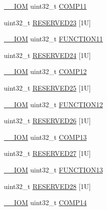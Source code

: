 \begin{DoxyCompactItemize}
\item 
\mbox{\hyperlink{core__cm4_8h_ab6caba5853a60a17e8e04499b52bf691}{\+\_\+\+\_\+\+I\+OM}} uint32\+\_\+t \mbox{\hyperlink{struct_d_w_t___type_ab5e5be1f4cce832413b02bd6eb8175f6}{C\+O\+M\+P11}}
\item 
uint32\+\_\+t \mbox{\hyperlink{struct_d_w_t___type_a214d76797c9fe16de56e22f950f55662}{R\+E\+S\+E\+R\+V\+E\+D23}} \mbox{[}1\+U\mbox{]}
\item 
\mbox{\hyperlink{core__cm4_8h_ab6caba5853a60a17e8e04499b52bf691}{\+\_\+\+\_\+\+I\+OM}} uint32\+\_\+t \mbox{\hyperlink{struct_d_w_t___type_a8e6200039c3ad48f811bd3dac9733523}{F\+U\+N\+C\+T\+I\+O\+N11}}
\item 
uint32\+\_\+t \mbox{\hyperlink{struct_d_w_t___type_a831c72f73ca4a91bc1014ab528a93fc8}{R\+E\+S\+E\+R\+V\+E\+D24}} \mbox{[}1\+U\mbox{]}
\item 
\mbox{\hyperlink{core__cm4_8h_ab6caba5853a60a17e8e04499b52bf691}{\+\_\+\+\_\+\+I\+OM}} uint32\+\_\+t \mbox{\hyperlink{struct_d_w_t___type_a73bbb409205cd8ae8438c8a58998d205}{C\+O\+M\+P12}}
\item 
uint32\+\_\+t \mbox{\hyperlink{struct_d_w_t___type_a2249e45a0457ba4cb8acf37632535c7a}{R\+E\+S\+E\+R\+V\+E\+D25}} \mbox{[}1\+U\mbox{]}
\item 
\mbox{\hyperlink{core__cm4_8h_ab6caba5853a60a17e8e04499b52bf691}{\+\_\+\+\_\+\+I\+OM}} uint32\+\_\+t \mbox{\hyperlink{struct_d_w_t___type_a46eae26a5823b24ae4211b6b8f27ecf0}{F\+U\+N\+C\+T\+I\+O\+N12}}
\item 
uint32\+\_\+t \mbox{\hyperlink{struct_d_w_t___type_a32a257dafeefc6d32acbfb46c907cc8b}{R\+E\+S\+E\+R\+V\+E\+D26}} \mbox{[}1\+U\mbox{]}
\item 
\mbox{\hyperlink{core__cm4_8h_ab6caba5853a60a17e8e04499b52bf691}{\+\_\+\+\_\+\+I\+OM}} uint32\+\_\+t \mbox{\hyperlink{struct_d_w_t___type_a8e7c69cbac19ef0b26b0ae0cc928da36}{C\+O\+M\+P13}}
\item 
uint32\+\_\+t \mbox{\hyperlink{struct_d_w_t___type_ab2616eeaef16e043f78f8fd70c28343b}{R\+E\+S\+E\+R\+V\+E\+D27}} \mbox{[}1\+U\mbox{]}
\item 
\mbox{\hyperlink{core__cm4_8h_ab6caba5853a60a17e8e04499b52bf691}{\+\_\+\+\_\+\+I\+OM}} uint32\+\_\+t \mbox{\hyperlink{struct_d_w_t___type_a72376480973424928cdc455caf65ff17}{F\+U\+N\+C\+T\+I\+O\+N13}}
\item 
uint32\+\_\+t \mbox{\hyperlink{struct_d_w_t___type_aa01a9b92d0df2a2c48314908696bc327}{R\+E\+S\+E\+R\+V\+E\+D28}} \mbox{[}1\+U\mbox{]}
\item 
\mbox{\hyperlink{core__cm4_8h_ab6caba5853a60a17e8e04499b52bf691}{\+\_\+\+\_\+\+I\+OM}} uint32\+\_\+t \mbox{\hyperlink{struct_d_w_t___type_af5930659b3107c17fa71e61803d63f97}{C\+O\+M\+P14}}

\end{DoxyCompactItemize}
